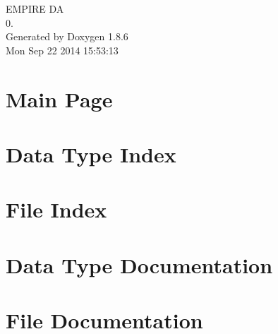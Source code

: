 \documentclass[twoside]{book}
\newcommand{\clearemptydoublepage}{%
  \newpage{\pagestyle{empty}\cleardoublepage}%
}
\begin{document}
\hypersetup{pageanchor=false}
\begin{titlepage}
\vspace*{7cm}
\begin{center}%
{\Large E\-M\-P\-I\-R\-E D\-A \\[1ex]\large 0. }\\
\vspace*{1cm}
{\large Generated by Doxygen 1.8.6}\\
\vspace*{0.5cm}
{\small Mon Sep 22 2014 15:53:13}\\
\end{center}
\end{titlepage}
\clearemptydoublepage
\tableofcontents
\clearemptydoublepage
{}
\hypersetup{pageanchor=true}

\chapter{Main Page}
\label{index}\hypertarget{index}{}
\chapter{Data Type Index}

\chapter{File Index}

\chapter{Data Type Documentation}









\chapter{File Documentation}































\newpage
{}
{}
\printindex
\end{document}
